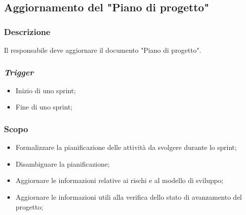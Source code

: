 \subsection{Aggiornamento del "Piano di progetto"}
\label{aggiornare-pdp}

\subsubsection{Descrizione}

Il responsabile deve aggiornare il documento "Piano di progetto".

\subsubsection{\textit{Trigger}}
\begin{itemize}
	\item Inizio di uno sprint\g;
	\item Fine di uno sprint\g;
\end{itemize}

\subsubsection{Scopo}
\begin{itemize}
	\item Formalizzare la pianificazione delle attività da svolgere durante
	      lo sprint\g;

	\item Disambiguare la pianificazione;

	\item Aggiornare le informazioni relative ai rischi e al modello di
	      sviluppo;

	\item Aggiornare le informazioni utili alla verifica dello stato di
	      avanzamento del progetto;
\end{itemize}

